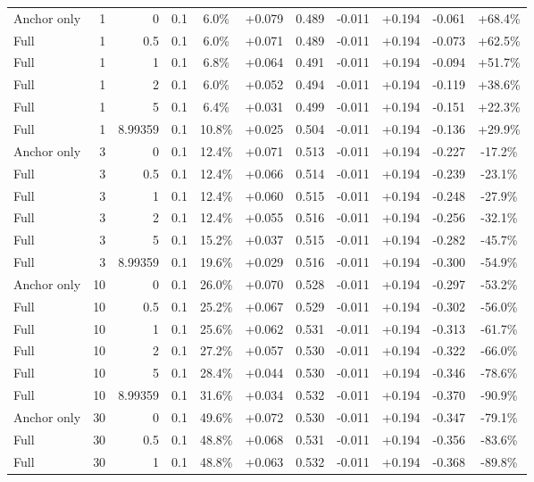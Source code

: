 \begin{table}[htbp]
\begin{tabular}{lrrrccccccc}
Anchor only & 1 & 0 & 0.1 & 6.0\% & +0.079 & 0.489 & -0.011 & +0.194 & -0.061 & +68.4\% \\
Full & 1 & 0.5 & 0.1 & 6.0\% & +0.071 & 0.489 & -0.011 & +0.194 & -0.073 & +62.5\% \\
Full & 1 & 1 & 0.1 & 6.8\% & +0.064 & 0.491 & -0.011 & +0.194 & -0.094 & +51.7\% \\
Full & 1 & 2 & 0.1 & 6.0\% & +0.052 & 0.494 & -0.011 & +0.194 & -0.119 & +38.6\% \\
Full & 1 & 5 & 0.1 & 6.4\% & +0.031 & 0.499 & -0.011 & +0.194 & -0.151 & +22.3\% \\
Full & 1 & 8.99359 & 0.1 & 10.8\% & +0.025 & 0.504 & -0.011 & +0.194 & -0.136 & +29.9\% \\
Anchor only & 3 & 0 & 0.1 & 12.4\% & +0.071 & 0.513 & -0.011 & +0.194 & -0.227 & -17.2\% \\
Full & 3 & 0.5 & 0.1 & 12.4\% & +0.066 & 0.514 & -0.011 & +0.194 & -0.239 & -23.1\% \\
Full & 3 & 1 & 0.1 & 12.4\% & +0.060 & 0.515 & -0.011 & +0.194 & -0.248 & -27.9\% \\
Full & 3 & 2 & 0.1 & 12.4\% & +0.055 & 0.516 & -0.011 & +0.194 & -0.256 & -32.1\% \\
Full & 3 & 5 & 0.1 & 15.2\% & +0.037 & 0.515 & -0.011 & +0.194 & -0.282 & -45.7\% \\
Full & 3 & 8.99359 & 0.1 & 19.6\% & +0.029 & 0.516 & -0.011 & +0.194 & -0.300 & -54.9\% \\
Anchor only & 10 & 0 & 0.1 & 26.0\% & +0.070 & 0.528 & -0.011 & +0.194 & -0.297 & -53.2\% \\
Full & 10 & 0.5 & 0.1 & 25.2\% & +0.067 & 0.529 & -0.011 & +0.194 & -0.302 & -56.0\% \\
Full & 10 & 1 & 0.1 & 25.6\% & +0.062 & 0.531 & -0.011 & +0.194 & -0.313 & -61.7\% \\
Full & 10 & 2 & 0.1 & 27.2\% & +0.057 & 0.530 & -0.011 & +0.194 & -0.322 & -66.0\% \\
Full & 10 & 5 & 0.1 & 28.4\% & +0.044 & 0.530 & -0.011 & +0.194 & -0.346 & -78.6\% \\
Full & 10 & 8.99359 & 0.1 & 31.6\% & +0.034 & 0.532 & -0.011 & +0.194 & -0.370 & -90.9\% \\
Anchor only & 30 & 0 & 0.1 & 49.6\% & +0.072 & 0.530 & -0.011 & +0.194 & -0.347 & -79.1\% \\
Full & 30 & 0.5 & 0.1 & 48.8\% & +0.068 & 0.531 & -0.011 & +0.194 & -0.356 & -83.6\% \\
Full & 30 & 1 & 0.1 & 48.8\% & +0.063 & 0.532 & -0.011 & +0.194 & -0.368 & -89.8\% \\

\end{tabular}
\end{table}
